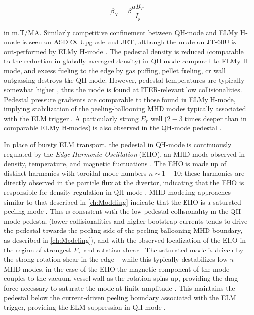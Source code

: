 \begin{equation}\label{eq:betan}
 \beta_N = \beta \frac{aB_T}{I_p}
\end{equation}

\noindent in $\si{\meter.\tesla\per\mega\ampere}$.  Similarly competitive confinement between QH-mode and ELMy H-mode is seen on ASDEX Upgrade and JET, although the mode on JT-60U is out-performed by ELMy H-mode \cite{Oyama2006}.  The pedestal density is reduced (comparable to the reduction in globally-averaged density) in QH-mode compared to ELMy H-mode, and excess fueling to the edge by gas puffing, pellet fueling, or wall outgassing destroys the QH-mode.  However, pedestal temperatures are typically somewhat higher \cite{Doyle2001}, thus the mode is found at ITER-relevant low collisionalities.  Pedestal pressure gradients are comparable to those found in ELMy H-mode, implying stabilization of the peeling-ballooning MHD modes typically associated with the ELM trigger \cite{Burrell2002}.  A particularly strong $E_r$ well ($2-3$ times deeper than in comparable ELMy H-modes) is also observed in the QH-mode pedestal \cite{Greenfield2002}.

In place of bursty ELM transport, the pedestal in QH-mode is continuously regulated by the \emph{Edge Harmonic Oscillation} (EHO), an MHD mode observed in density, temperature, and magnetic fluctuations \cite{Burrell2002}.  The EHO is made up of distinct harmonics with toroidal mode numbers $n \sim 1-10$; these harmonics are directly observed in the particle flux at the divertor, indicating that the EHO is responsible for density regulation in QH-mode \cite{Doyle2001}.  MHD modeling approaches similar to that described in \cref{ch:Modeling} indicate that the EHO is a saturated peeling mode \cite{Snyder2007,Osborne2008,Snyder2012}.  This is consistent with the low pedestal collisionality in the QH-mode pedestal (lower collisionalities and higher bootstrap currents tends to drive the pedestal towards the peeling side of the peeling-ballooning MHD boundary, as described in \cref{ch:Modeling}), and with the observed localization of the EHO in the region of strongest $E_r$ and rotation shear \cite{Burrell2001}.  The saturated mode is driven by the strong rotation shear in the edge -- while this typically destabilizes low-$n$ MHD modes, in the case of the EHO the magnetic component of the mode couples to the vacuum-vessel wall as the rotation spins up, providing the drag force necessary to saturate the mode at finite amplitude \cite{Burrell2009}.  This maintains the pedestal below the current-driven peeling boundary associated with the ELM trigger, providing the ELM suppression in QH-mode \cite{Snyder2012}.


